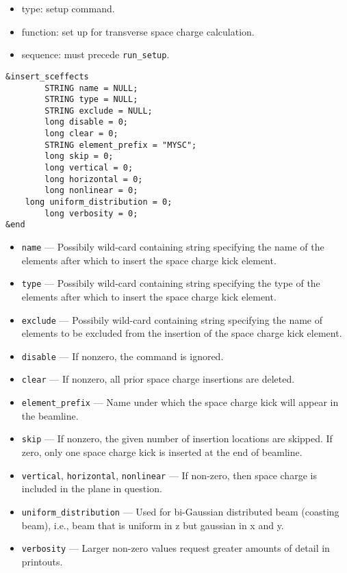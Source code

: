 \documentclass[11pt]{article}
\begin{document}
\begin{itemize}
\item type: setup command.
\item function: set up for transverse space charge calculation.  
\item sequence: must precede \verb|run_setup|.
\end{itemize}

\begin{verbatim}
&insert_sceffects
        STRING name = NULL;
        STRING type = NULL;
        STRING exclude = NULL;
        long disable = 0;
        long clear = 0;
        STRING element_prefix = "MYSC";
        long skip = 0;
        long vertical = 0;
        long horizontal = 0;
        long nonlinear = 0;
	long uniform_distribution = 0;
        long verbosity = 0;
&end
\end{verbatim}

\begin{itemize}
\item \verb|name| --- Possibily wild-card containing string specifying the
	name of the elements after which to insert the space charge kick element.
\item \verb|type| --- Possibily wild-card containing string specifying the
        type of the elements after which to insert the space charge kick element.
\item \verb|exclude| --- Possibily wild-card containing string specifying 
	the name of elements to be excluded from the insertion of the space charge kick element.
\item \verb|disable| --- If nonzero, the command is ignored.
\item \verb|clear| --- If nonzero, all prior space charge insertions are deleted.
\item \verb|element_prefix| --- Name under which the space charge kick will appear in the beamline.
\item \verb|skip| --- If nonzero, the given number of insertion locations are skipped. 
        If zero, only one space charge kick is inserted at the end of beamline. 
\item \verb|vertical|, \verb|horizontal|, \verb|nonlinear| --- If non-zero, then space charge is
included in the plane in question.
\item \verb|uniform_distribution| --- Used for bi-Gaussian distributed beam (coasting beam), i.e., beam that is
  uniform in z but gaussian in x and y.
\item \verb|verbosity| --- Larger non-zero values request greater amounts of detail in printouts.
\end{itemize}
\end{document}
